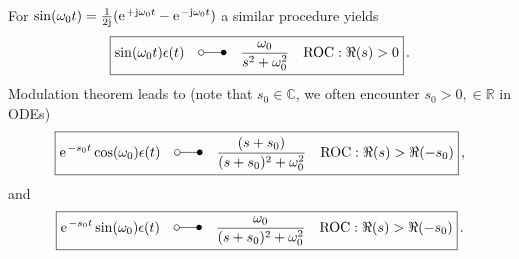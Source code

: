 \documentclass[a4paper,11pt,oneside]{scrartcl}
\begin{document}
%
For $\sin(\omega_0 t) = \frac{1}{2 \im} (\e^{+\im \omega_0 t}-\e^{-\im \omega_0 t})$ a similar
procedure yields
\begin{align}
\boxed{
\sin(\omega_0 t)\epsilon(t)\quad \laplace \quad \frac{\omega_0}{s^2 + \omega_0^2} \quad \text{ROC}: \Re(s)>0}\,.
\end{align}
%
Modulation theorem leads to (note that $s_0 \in \mathbb{C}$, we often encounter $s_0 > 0, \in \mathbb{R}$ in ODEs)
\begin{align}
\boxed{\e^{-s_0 t} \cos(\omega_0) \epsilon(t)\quad \laplace \quad \frac{(s+s_0)}{(s+s_0)^2 + \omega_0^2}\quad \text{ROC}: \Re(s)>\Re(-s_0)}\,,
\end{align}
and
\begin{align}
\boxed{\e^{-s_0 t} \sin(\omega_0) \epsilon(t)\quad \laplace \quad \frac{\omega_0}{(s+s_0)^2 + \omega_0^2}\quad \text{ROC}: \Re(s)>\Re(-s_0)}\,.
\end{align}



\end{document}
